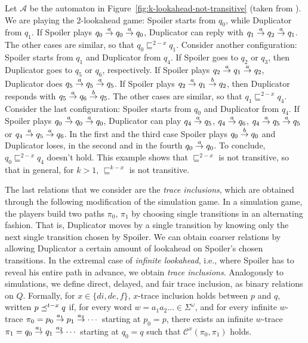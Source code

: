 \begin{example}
\label{ex:k-lookahead-not-transitive}
Let $\mathcal{A}$ be the automaton in Figure~\ref{fig:k-lookahead-not-transitive}
(taken from \cite{clemente2017efficient}).
We are playing the $2$-lookahead game: Spoiler starts from
$q_0$, while Duplicator from $q_1$.
If Spoiler plays $q_0 \overset{a}{\rightarrow} q_0 \overset{a}{\rightarrow} q_0$, Duplicator can reply with
$q_1 \overset{a}{\rightarrow} q_2 \overset{a}{\rightarrow} q_1$.
The other cases are similar, so that $q_0 \sqsubseteq^{2-x} q_1$.
Consider another configuration: Spoiler starts from $q_1$ and Duplicator from $q_4$.
If Spoiler goes to $q_2$ or $q_3$, then Duplicator goes to $q_5$ or $q_6$, respectively.
If Spoiler plays $q_2 \overset{a}{\rightarrow} q_1 \overset{a}{\rightarrow} q_2$, Duplicator does
$q_5 \overset{a}{\rightarrow} q_5 \overset{a}{\rightarrow} q_5$.
If Spoiler plays $q_2 \overset{a}{\rightarrow} q_1 \overset{b}{\rightarrow} q_2$, then Duplicator responds with
$q_5 \overset{a}{\rightarrow} q_6 \overset{b}{\rightarrow} q_5$.
The other cases are similar, so that $q_1 \sqsubseteq^{2-x} q_4$.
Consider the last configuration: Spoiler starts from $q_0$ and Duplicator from $q_4$.
If Spoiler plays $q_0 \overset{a}{\rightarrow} q_0 \overset{a}{\rightarrow} q_0$, Duplicator can play $q_4 \overset{a}{\rightarrow} q_5$,
$q_4 \overset{a}{\rightarrow} q_6$, $q_4 \overset{a}{\rightarrow} q_5 \overset{a}{\rightarrow} q_5$ or $q_4 \overset{a}{\rightarrow} q_5 \overset{a}{\rightarrow} q_6$.
In the first and the third case Spoiler plays $q_0 \overset{b}{\rightarrow} q_0$ and Duplicator loses,
in the second and in the fourth $q_0 \overset{a}{\rightarrow} q_0$.
To conclude, $q_0 \sqsubseteq^{2-x} q_4$ doesn't hold.
This example shows that $\sqsubseteq^{2-x}$ is not transitive, so that
in general, for $k > 1$, $\sqsubseteq^{k-x}$ is not transitive.
\end{example}

The last relations that we consider are the \emph{trace inclusions},
which are obtained through the following modification of the simulation game.
In a simulation game, the players build two paths $\pi_0$, $\pi_1$ by choosing single transitions
in an alternating fashion.
That is, Duplicator moves by a single transition by knowing only
the next single transition chosen by Spoiler.
We can obtain coarser relations by allowing Duplicator a certain amount of
lookahead on Spoiler's chosen transitions.
In the extremal case of \emph{infinite lookahead}, i.e., where Spoiler has to
reveal his entire path in advance, we obtain \emph{trace inclusions}.
Analogously to simulations, we define direct, delayed, and fair
trace inclusion, as binary relations on $Q$.
Formally, for $x \in \{di, de, f\}$, $x$-trace inclusion
holds between $p$ and $q$, written $p \preceq^{t-x} q$ if,
for every word $w = a_1 a_2 \dots \in \Sigma^{\omega}$, and for every
infinite $w$-trace $\pi_0 = p_0 \overset{a_1}{\rightarrow} p_1 \overset{a_2}{\rightarrow} \cdots$
starting at $p_0 = p$, there exists an infinite $w$-trace
$\pi_1 = q_0 \overset{a_1}{\rightarrow} q_1 \overset{a_2}{\rightarrow} \cdots$
starting at $q_0 = q$ such that $\mathcal{C}^x(\pi_0,\pi_1)$ holds.

